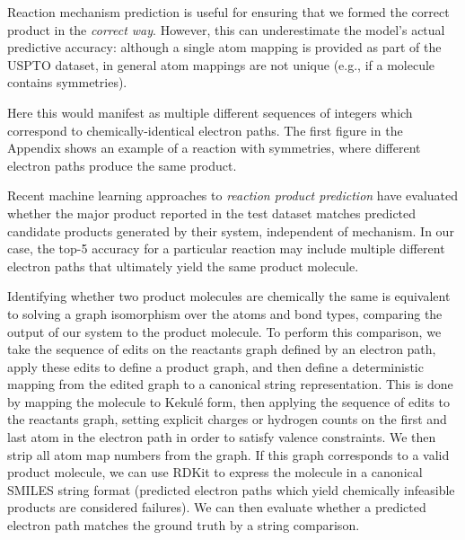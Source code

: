 Reaction mechanism prediction is useful for ensuring that we formed the correct product in the {\em correct way}.
However, this can underestimate the model's actual predictive accuracy: 
although a single atom mapping is provided as part of the USPTO dataset, in general atom mappings are not unique (e.g., if a molecule contains symmetries). 

Here this would manifest as multiple different sequences of integers which correspond to chemically-identical electron paths. 
The first figure in the Appendix shows an example of a reaction with symmetries, where different electron paths produce the same product. 

Recent machine learning approaches to {\em reaction product prediction} \citep{jin2017predicting,schwaller2017found}
have evaluated whether the major product reported in the test dataset matches predicted candidate products generated by their system, independent of mechanism.
In our case, the top-5 accuracy for a particular reaction may include multiple different electron paths that ultimately yield the same product molecule.

Identifying whether two product molecules are chemically the same is equivalent to solving a graph isomorphism over the atoms and bond types, comparing the output of our system to the product molecule.
To perform this comparison, we take the sequence of edits on the reactants graph defined by an electron path,  
apply these edits to define a product graph, 
and then define a deterministic mapping from the edited graph to a canonical string representation.
This is done by mapping the molecule to Kekul\'e form, 
then applying the sequence of edits to the reactants graph,
setting explicit charges or hydrogen counts on the first and last atom in the electron path in order to satisfy valence constraints.
We then strip all atom map numbers from the graph.
If this graph corresponds to a valid product molecule, we can use RDKit to express the molecule in a canonical SMILES string format 
(predicted electron paths which yield chemically infeasible products are considered failures).
We can then evaluate whether a predicted electron path matches the ground truth by a string comparison.

